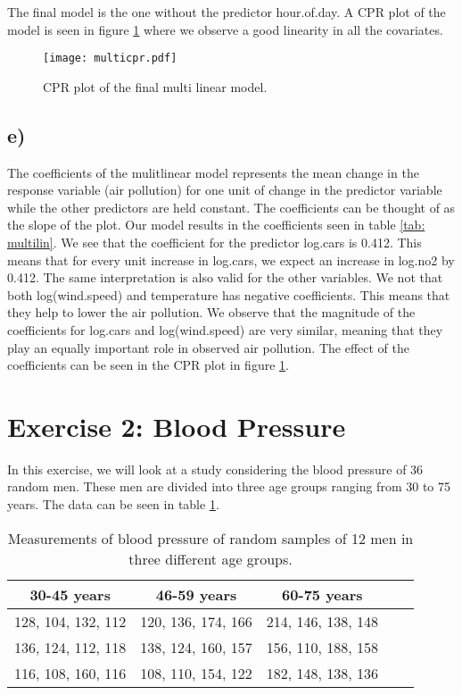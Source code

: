 \documentclass[a4paper, 10pt, reqno]{amsart}
\begin{document}
The final model is the one without the predictor hour.of.day. A CPR plot of the model is seen in figure \ref{fig: multi cpr} where we observe a good linearity in all the covariates.

\begin{figure}[h]
    \centering
    \texttt{[image: multicpr.pdf]}
    \caption{CPR plot of the final multi linear model.}
    \label{fig: multi cpr}
\end{figure}

\subsection{e)}
The coefficients of the mulitlinear model represents the mean change in the response variable (air pollution) for one unit of change in the predictor variable while the other predictors are held constant. The coefficients can be thought of as the slope of the plot. Our model results in the coefficients seen in table \ref{tab: multilin}. We see that the coefficient for the predictor log.cars is 0.412. This means that for every unit increase in log.cars, we expect an increase in log.no2 by 0.412. The same interpretation is also valid for the other variables. We not that both log(wind.speed) and temperature has negative coefficients. This means that they help to lower the air pollution. We observe that the magnitude of the coefficients for log.cars and log(wind.speed) are very similar, meaning that they play an equally important role in observed air pollution. The effect of the coefficients can be seen in the CPR plot in figure \ref{fig: multi cpr}.

\section{Exercise 2: Blood Pressure}
In this exercise, we will look at a study considering the blood pressure of 36 random men. These men are divided into three age groups ranging from 30 to 75 years. The data can be seen in table \ref{tab: blood}.
\begin{table}[h]
    \caption{Measurements of blood pressure of random samples of 12 men in three different age groups.}
    \label{tab: blood}
    \begin{tabular}{|c|c|c|c|c|}
        \hline \hline 
        30-45 years  & 46-59 years & 60-75 years \\ 
        \hline 128, 104, 132, 112 & 120, 136, 174, 166 & 214, 146, 138, 148 \\ 
        \hline 136, 124, 112, 118 & 138, 124, 160, 157 & 156, 110, 188, 158 \\
        \hline 116, 108, 160, 116 & 108, 110, 154, 122 & 182, 148, 138, 136 \\ 
        \hline\hline 
    \end{tabular}
\end{table}
\end{document}
